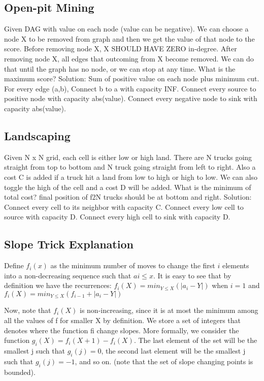 \subsection{Open-pit Mining}
Given DAG with value on each node (value can be negative). We can choose a node X to be removed from graph and then 
we get the value of that node to the score. Before removing node X, X SHOULD HAVE ZERO in-degree. After removing node X, all edges that outcoming from X become removed. We can do that until the graph has no node, or we can stop at any time.
What is the maximum score? Solution: Sum of positive value on each node plus minimum cut. For every edge (a,b), Connect b to a with capacity INF. Connect every source to positive node with capacity abs(value). Connect every negative node to sink with capacity abs(value).
\subsection{Landscaping}
Given N x N grid, each cell is either low or high land. There are N trucks going straight from top to bottom and N truck going straight from left to right.
Also a cost C is added if a truck hit a land from low to high or high to low. 
We can also toggle the high of the cell and a cost D will be added. 
What is the minimum of total cost? final position of f2N trucks should be at bottom and right. Solution: Connect every cell to its neighbor with capacity C. Connect every low cell to source with capacity D. Connect every high cell to sink with capacity D.

\subsection{Slope Trick Explanation}
Define $f_{i}(x)$ as the minimum number of moves to change the first $i$ elements into a non-decreasing sequence such that $ai \leq x$.
It is easy to see that by definition we have the recurrences:
$f_{i}(X) = min_{Y \leq X}(|a_{i}-Y|)$ when $i=1$
and
$f_{i}(X) = min_{Y \leq X}(f_{i-1}+|a_{i}-Y|)$

Now, note that $f_{i}(X)$ is non-increasing, since it is at most the minimum among all the values of f for smaller X by definition. We store a set of integers that denotes where the function fi change slopes. More formally, we consider the function $g_{i}(X) = f_{i}(X+1)-f_{i}(X)$. The last element of the set will be the smallest j such that $g_{i}(j)=0$, the second last element will be the smallest j such that $g_{i}(j)=-1$, and so on. 
(note that the set of slope changing points is bounded).


